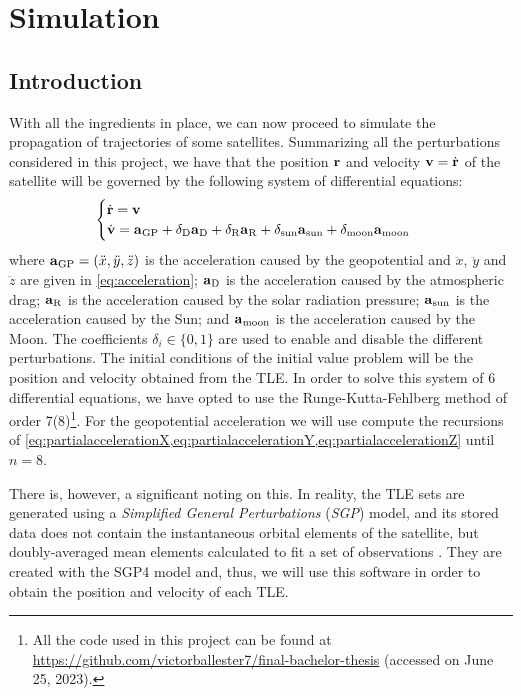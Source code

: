 \documentclass[../main.tex]{subfiles}
\begin{document}
\section{Simulation}\label{sec:simulation}
\subsection{Introduction}
With all the ingredients in place, we can now proceed to simulate the propagation of trajectories of some satellites.
Summarizing all the perturbations considered in this project, we have that the position $\boldsymbol{\mathrm{r}}$ and velocity $\boldsymbol{\mathrm{v}}=\dot{\boldsymbol{\mathrm{r}}}$ of the satellite will be governed by the following system of differential equations:
\begin{equation}
  \begin{cases}
    \dot{\boldsymbol{\mathrm{r}}}=\boldsymbol{\mathrm{v}} \\
    \dot{\boldsymbol{\mathrm{v}}}=\boldsymbol{\mathrm{a}}_{\mathrm{GP}} + \delta_{\mathrm{D}}\boldsymbol{\mathrm{a}}_{\mathrm{D}}+\delta_{\mathrm{R}}\boldsymbol{\mathrm{a}}_{\mathrm{R}}+\delta_{\mathrm{sun}}\boldsymbol{\mathrm{a}}_{\mathrm{sun}}+\delta_{\mathrm{moon}}\boldsymbol{\mathrm{a}}_\mathrm{moon}
  \end{cases}
\end{equation}
where $\boldsymbol{\mathrm{a}}_{\mathrm{GP}}=(\ddot{x},\ddot{y},\ddot{z})$ is the acceleration caused by the geopotential and $\ddot{x}$, $\ddot{y}$ and $\ddot{z}$ are given in \cref{eq:acceleration}; $\boldsymbol{\mathrm{a}}_{\mathrm{D}}$ is the acceleration caused by the atmospheric drag; $\boldsymbol{\mathrm{a}}_{\mathrm{R}}$ is the acceleration caused by the solar radiation pressure; $\boldsymbol{\mathrm{a}}_{\mathrm{sun}}$ is the acceleration caused by the Sun; and $\boldsymbol{\mathrm{a}}_{\mathrm{moon}}$ is the acceleration caused by the Moon. The coefficients $\delta_{i}\in\{0,1\}$ are used to enable and disable the different perturbations. The initial conditions of the initial value problem will be the position and velocity obtained from the TLE. In order to solve this system of 6 differential equations, we have opted to use the Runge-Kutta-Fehlberg method of order 7(8)\footnote{All the code used in this project can be found at \url{https://github.com/victorballester7/final-bachelor-thesis} (accessed on June 25, 2023).}. For the geopotential acceleration we will use compute the recursions of \cref{eq:partialaccelerationX,eq:partialaccelerationY,eq:partialaccelerationZ} until $n=8$.

There is, however, a significant noting on this. In reality, the TLE sets are generated using a \emph{Simplified General Perturbations} (\emph{SGP}) model, and its stored data does not contain the instantaneous orbital elements of the satellite, but doubly-averaged mean elements calculated to fit a set of observations \cite{celestrak,celestrakReport}.
They are created with the SGP4 model and, thus, we will use this software in order to obtain the position and velocity of each TLE.
\end{document}
